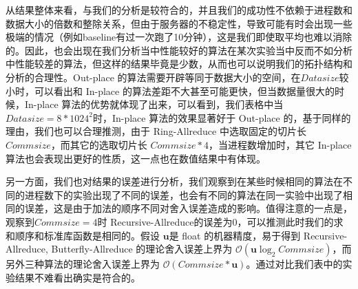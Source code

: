 \documentclass{article}
\begin{document}
从结果整体来看，与我们的分析是较符合的，并且我们的成功性不依赖于进程数和数据大小的倍数和整除关系，但由于服务器的不稳定性，导致可能有时会出现一些极端的情况（例如baseline有过一次跑了10分钟），这是我们即使取平均也难以消除的。因此，也会出现在我们分析当中性能较好的算法在某次实验当中反而不如分析中性能较差的算法，但这样的结果毕竟是少数，从而也可以说明我们的拓扑结构和分析的合理性。Out-place 的算法需要开辟等同于数据大小的空间，在$Datasize$较小时，可以看出和 In-place 的算法差距不大甚至可能更快，但当数据量很大的时候，In-place 算法的优势就体现了出来，可以看到，我们表格中当$Datasize=8*1024^2$时，In-place 算法的效果显著好于 Out-place 的，基于同样的理由，我们也可以合理推测，由于 Ring-Allreduce 中选取固定的切片长 $Commsize$，而其它的选取切片长 $Commsize*4$，当进程数增加时，其它 In-place 算法也会表现出更好的性质，这一点也在数值结果中有体现。

另一方面，我们也对结果的误差进行分析，我们观察到在某些时候相同的算法在不同的进程数下的实验出现了不同的误差，也会有不同的算法在同一实验中出现了相同的误差，这是由于加法的顺序不同对舍入误差造成的影响。值得注意的一点是，观察到$Commsize=4$时 Recursive-Allreduce的误差为0，可以推测此时我们的求和顺序和标准库函数是相同的。假设 $\mathbf{u}$是 float 的机器精度，易于得到 Recursive-Allreduce, Butterfly-Allreduce 的理论舍入误差上界为 $\mathcal O(\mathbf u\log_2Commsize)$，而另外三种算法的理论舍入误差上界为 $\mathcal O(Commsize*\mathbf u)$。通过对比我们表中的实验结果不难看出确实是符合的。

	  
	\nocite{*}

\end{document}
